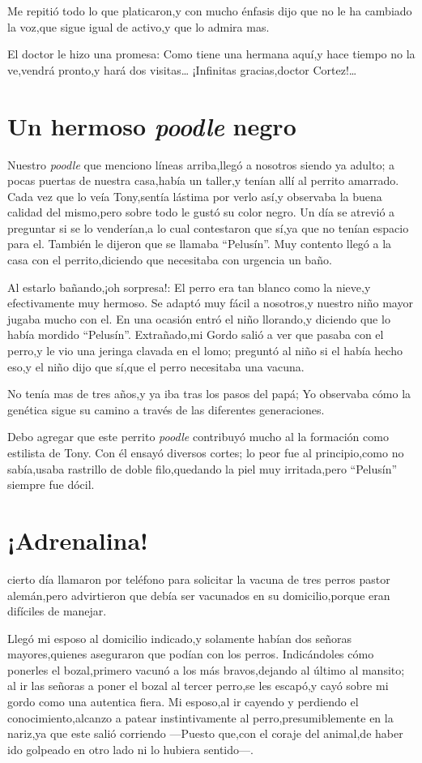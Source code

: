 \documentclass[letterpaper,12pt]{book}
\begin{document}
Me repitió todo lo que platicaron,y con mucho énfasis dijo que no le ha cambiado la voz,que sigue igual de activo,y que lo admira mas.

El doctor le hizo una promesa: Como tiene una hermana aquí,y hace tiempo no la ve,vendrá pronto,y hará dos visitas\ldots
¡Infinitas gracias,doctor Cortez!\ldots
\chapter{Un hermoso {\it poodle}\/ negro}
Nuestro {\it poodle}\/ que menciono líneas arriba,llegó a nosotros siendo ya adulto; a pocas puertas de nuestra casa,había un taller,y tenían allí al perrito amarrado. Cada vez que lo veía Tony,sentía lástima por verlo así,y observaba la buena calidad del mismo,pero sobre todo le gustó su color negro. Un día se atrevió a preguntar si se lo venderían,a lo cual contestaron que sí,ya que no tenían espacio para el. También le dijeron que se llamaba ``Pelusín''. Muy contento llegó a la casa con el perrito,diciendo que necesitaba con urgencia un baño.

Al estarlo bañando,¡oh sorpresa!: El perro era tan blanco como la nieve,y efectivamente muy hermoso. Se adaptó muy fácil a nosotros,y nuestro niño mayor  jugaba mucho con el. En una ocasión entró el niño llorando,y diciendo que lo había mordido ``Pelusín''. Extrañado,mi Gordo salió a ver que pasaba con el perro,y le vio una jeringa clavada en el lomo; preguntó al niño si el había hecho eso,y el niño dijo que sí,que el perro necesitaba una vacuna.

No tenía mas de tres años,y ya iba tras los pasos del papá; Yo observaba cómo la genética sigue su camino a través de las diferentes generaciones.

Debo agregar que este perrito {\it poodle}\/ contribuyó mucho  al la formación como estilista de Tony. Con él ensayó diversos cortes; lo peor fue al principio,como no sabía,usaba rastrillo de doble filo,quedando la piel muy irritada,pero ``Pelusín'' siempre fue dócil.
\chapter{¡Adrenalina!}
cierto día llamaron por teléfono para solicitar la vacuna de tres perros pastor alemán,pero advirtieron que debía ser vacunados en su domicilio,porque eran difíciles de manejar.

Llegó mi esposo al domicilio indicado,y solamente habían dos señoras mayores,quienes aseguraron que podían con los perros. Indicándoles cómo ponerles el bozal,primero vacunó a los más bravos,dejando al último al mansito; al ir las señoras a poner el bozal al tercer perro,se les escapó,y cayó sobre mi gordo como una autentica fiera. Mi esposo,al ir cayendo y perdiendo el conocimiento,alcanzo a patear instintivamente al perro,presumiblemente en la nariz,ya que este salió corriendo ---Puesto que,con el coraje del animal,de haber ido golpeado en otro lado ni lo hubiera sentido---. 
\end{document}
